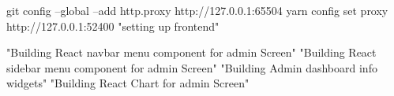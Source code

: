 git config --global --add http.proxy http://127.0.0.1:65504
yarn config set proxy http://127.0.0.1:52400
"setting up frontend"

"Building React navbar menu component for admin Screen"
"Building React sidebar menu component for admin Screen"
"Building Admin dashboard info widgets"
"Building React Chart for admin Screen"
